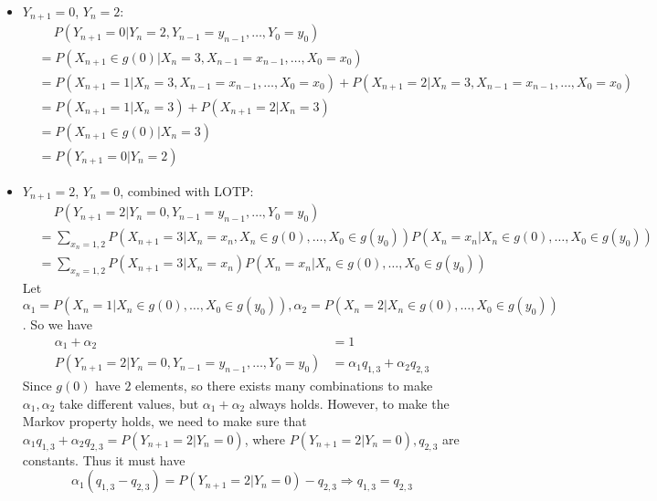 \begin{homeworkProblem}
\begin{itemize}
\item $Y_{n+1}=0$, $Y_n=2$:
\begin{align*}
&\quad\ P(Y_{n+1}=0|Y_n=2,Y_{n-1}=y_{n-1},\ldots,Y_0=y_0) \\
&= P(X_{n+1}\in g(0)|X_n=3,X_{n-1}=x_{n-1},\ldots,X_0=x_0) \\
&= P(X_{n+1}=1|X_n=3,X_{n-1}=x_{n-1},\ldots,X_0=x_0) + P(X_{n+1}=2|X_n=3,X_{n-1}=x_{n-1},\ldots,X_0=x_0) \\
&= P(X_{n+1}=1|X_n=3) + P(X_{n+1}=2|X_n=3) \\
&= P(X_{n+1}\in g(0)|X_n=3) \\
&= P(Y_{n+1}=0|Y_n=2)
\end{align*}

\item $Y_{n+1}=2$, $Y_n=0$, combined with LOTP:
\begin{align*}
&\quad\ P(Y_{n+1}=2|Y_n=0,Y_{n-1}=y_{n-1},\ldots,Y_0=y_0) \\
&= \sum_{x_n=1,2} P(X_{n+1}=3|X_n=x_n,X_n\in g(0),\ldots,X_0\in g(y_0))P(X_n=x_n|X_n\in g(0),\ldots,X_0\in g(y_0)) \\
&= \sum_{x_n=1,2} P(X_{n+1}=3|X_n=x_n)P(X_n=x_n|X_n\in g(0),\ldots,X_0\in g(y_0))
\end{align*}
Let $\alpha_1=P(X_n=1|X_n\in g(0),\ldots,X_0\in g(y_0)),\alpha_2=P(X_n=2|X_n\in g(0),\ldots,X_0\in g(y_0))$. So we have
\begin{align*}
\alpha_1+\alpha_2 &= 1 \\
P(Y_{n+1}=2|Y_n=0,Y_{n-1}=y_{n-1},\ldots,Y_0=y_0) &= \alpha_1q_{1,3}+\alpha_2q_{2,3}
\end{align*}
Since $g(0)$ have $2$ elements, so there exists many combinations to make $\alpha_1,\alpha_2$ take different values, but $\alpha_1+\alpha_2$ always holds. However, to make the Markov property holds, we need to make sure that $\alpha_1q_{1,3}+\alpha_2q_{2,3}=P(Y_{n+1}=2|Y_n=0)$, where $P(Y_{n+1}=2|Y_n=0),q_{2,3}$ are constants. Thus it must have
$$\alpha_1(q_{1,3}-q_{2,3})=P(Y_{n+1}=2|Y_n=0)-q_{2,3} \Rightarrow q_{1,3}=q_{2,3}$$


\end{itemize}
\end{homeworkProblem}
